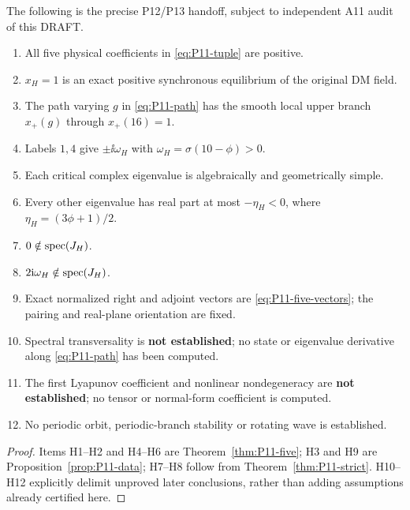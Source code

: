 \begin{proposition}
\label{prop:P11-ledger}
The following is the precise P12/P13 handoff, subject to independent
A11 audit of this DRAFT.
\begin{enumerate}[label=H\arabic*.,leftmargin=3em]
 \item All five physical coefficients in \eqref{eq:P11-tuple} are positive.
 \item $x_H=1$ is an exact positive synchronous equilibrium of the original DM field.
 \item The path varying $g$ in \eqref{eq:P11-path} has the smooth local
       upper branch $x_+(g)$ through $x_+(16)=1$.
 \item Labels $1,4$ give $\pm\ii\omega_H$ with $\omega_H=\sigma(10-\phi)>0$.
 \item Each critical complex eigenvalue is algebraically and geometrically simple.
 \item Every other eigenvalue has real part at most $-\eta_H<0$,
       where $\eta_H=(3\phi+1)/2$.
 \item $0\notin\operatorname{spec}(J_H)$.
 \item $2\mathrm{i}\omega_H\notin\operatorname{spec}(J_H)$.
 \item Exact normalized right and adjoint vectors are \eqref{eq:P11-five-vectors};
       the pairing and real-plane orientation are fixed.
 \item Spectral transversality is \textbf{not established}; no state or
       eigenvalue derivative along \eqref{eq:P11-path} has been computed.
 \item The first Lyapunov coefficient and nonlinear nondegeneracy are
       \textbf{not established}; no tensor or normal-form coefficient is computed.
 \item No periodic orbit, periodic-branch stability or rotating wave is established.
\end{enumerate}
\end{proposition}
\begin{proof}
Items H1--H2 and H4--H6 are Theorem~\ref{thm:P11-five}; H3 and
H9 are Proposition~\ref{prop:P11-data}; H7--H8 follow from
Theorem~\ref{thm:P11-strict}. H10--H12 explicitly delimit unproved
later conclusions, rather than adding assumptions already certified here.
\end{proof}

